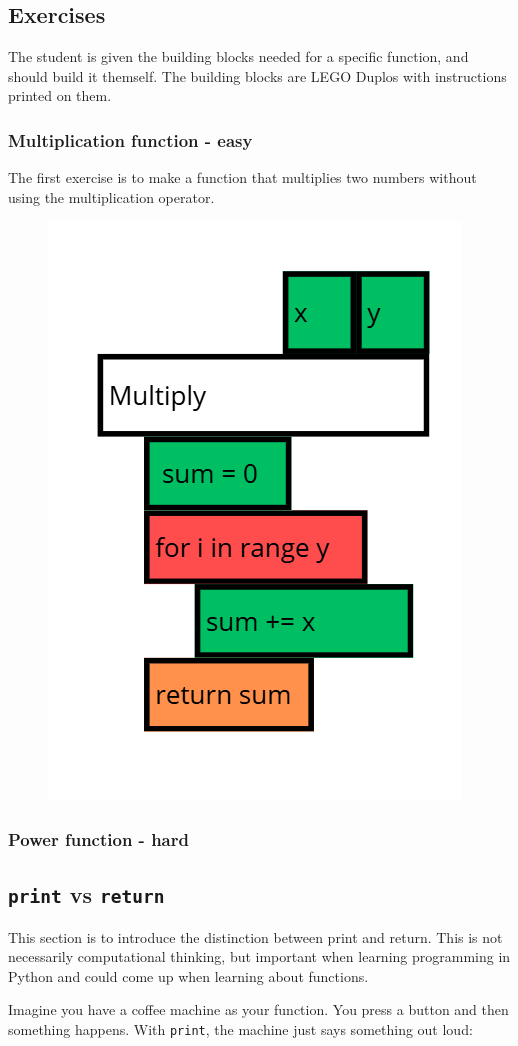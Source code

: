 \subsection{Exercises}
The student is given the building blocks needed for a specific function, and should build it themself. The building blocks are LEGO Duplos with instructions printed on them.

\subsubsection{Multiplication function - easy}
The first exercise is to make a function that multiplies two numbers without using the multiplication operator.
\begin{figure}
    \centering
    \includegraphics[width=0.5\linewidth]{Billeder/Multiplication function.png}
\end{figure}

\subsubsection{Power function - hard}

\subsection{\texttt{print} vs \texttt{return}}
This section is to introduce the distinction between print and return. This is not necessarily computational thinking, but important when learning programming in Python and could come up when learning about functions.

Imagine you have a coffee machine as your function. You press a button and then something happens. With \texttt{print}, the machine just says something out loud:

